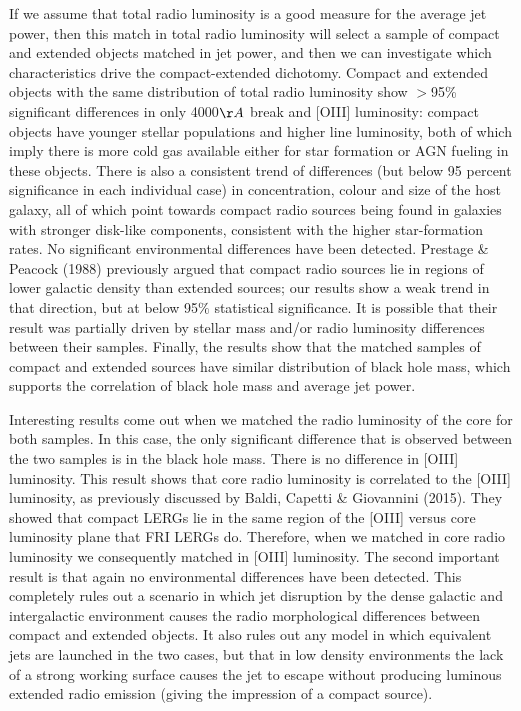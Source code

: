 \documentclass[usenatbib]{mn2e}
\begin{document}
If we assume that total radio luminosity is a good measure for the average
jet power, then this match in total radio luminosity will select a sample
of compact and extended objects matched in jet power, and then we can
investigate which characteristics drive the compact-extended
dichotomy. Compact and extended objects with the same distribution of
total radio luminosity show $>$95\% significant differences in only
4000$\AA$ break and [OIII] luminosity: compact objects have younger
stellar populations and higher line luminosity, both of which imply there
is more cold gas available either for star formation or AGN fueling in
these objects. There is also a consistent trend of differences (but below
95 percent significance in each individual case) in concentration, colour
and size of the host galaxy, all of which point towards compact radio
sources being found in galaxies with stronger disk-like components,
consistent with the higher star-formation rates. No significant
environmental differences have been detected. Prestage \& Peacock (1988)
previously argued that compact radio sources lie in regions of lower
galactic density than extended sources; our results show a weak trend in
that direction, but at below 95$\%$ statistical significance. It is
possible that their result was partially driven by stellar mass and/or
radio luminosity differences between their samples. Finally, the results
show that the matched samples of compact and extended sources have similar
distribution of black hole mass, which supports the correlation of black
hole mass and average jet power.

Interesting results come out when we matched the radio luminosity of the
core for both samples. In this case, the only significant difference that
is observed between the two samples is in the black hole mass. There is no
difference in [OIII] luminosity. This result shows that core radio
luminosity is correlated to the [OIII] luminosity, as previously discussed
by Baldi, Capetti \& Giovannini (2015). They showed that compact LERGs lie
in the same region of the [OIII] versus core luminosity plane that FRI LERGs
do. Therefore, when we matched in core radio luminosity we consequently
matched in [OIII] luminosity. The second important result is that again no
environmental differences have been detected. This completely rules out a
scenario in which jet disruption by the dense galactic and intergalactic
environment causes the radio morphological differences between compact and
extended objects. It also rules out any model in which equivalent jets are
launched in the two cases, but that in low density environments the lack
of a strong working surface causes the jet to escape without producing
luminous extended radio emission (giving the impression of a compact
source). 
\end{document}
